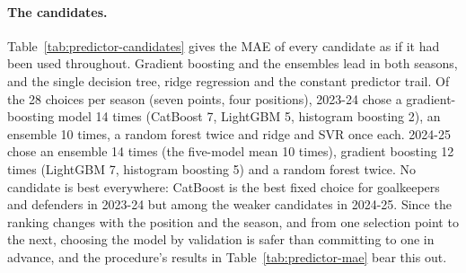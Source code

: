 \documentclass[12pt,oneside,a4paper]{book}
\theoremstyle{definition}
\theoremstyle{remark}
\begin{document}
	\paragraph{The candidates.} Table~\ref{tab:predictor-candidates} gives the MAE of every
	candidate as if it had been used throughout. Gradient boosting and the ensembles lead in both
	seasons, and the single decision tree, ridge regression and the constant predictor trail. Of
	the 28 choices per season (seven points, four positions), 2023-24 chose a gradient-boosting
	model 14 times (CatBoost 7, LightGBM 5, histogram boosting 2), an ensemble 10 times, a random
	forest twice and ridge and SVR once each. 2024-25 chose an ensemble 14 times (the five-model mean
	10 times), gradient boosting 12 times (LightGBM 7, histogram boosting 5) and a random forest
	twice. No candidate is best everywhere: CatBoost is the best fixed choice for goalkeepers and
	defenders in 2023-24 but among the weaker candidates in 2024-25. Since the ranking changes with
	the position and the season, and from one selection point to the next, choosing the model by
	validation is safer than committing to one in advance, and the procedure's results in
	Table~\ref{tab:predictor-mae} bear this out.
\end{document}
